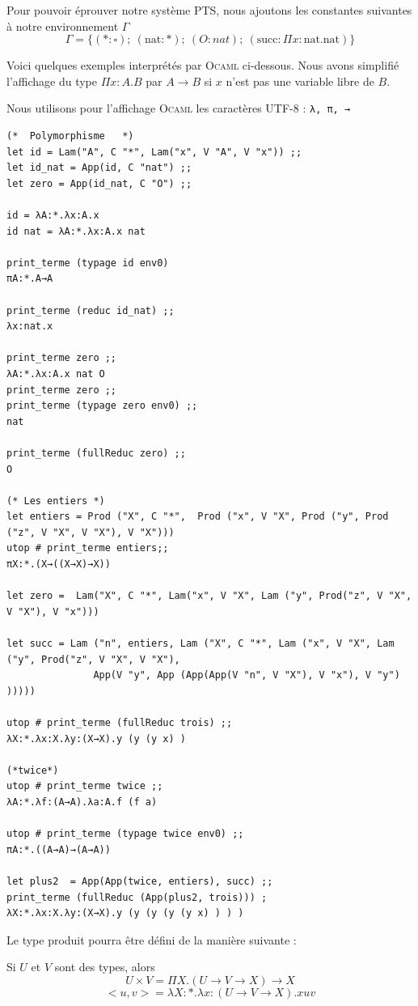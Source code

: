 Pour pouvoir éprouver notre système PTS, nous ajoutons les constantes suivantes à notre environnement $\Gamma$
$$\Gamma = \{ (*:\square) ;\ (\text{nat}:*) ;\ (O:nat) ;\ (\text{succ}:\Pi x:\text{nat}.\text{nat}) \} $$

Voici quelques exemples interprétés par \textsc{Ocaml} ci-dessous. Nous avons simplifié l'affichage
du type $\Pi x:A.B$ par $A\rightarrow B$ si $x$ n'est pas une variable libre de $B$.

Nous utilisons pour l'affichage \textsc{Ocaml} les caractères UTF-8 :  \texttt{λ, π, →}

\begin{verbatim}
(*  Polymorphisme   *)
let id = Lam("A", C "*", Lam("x", V "A", V "x")) ;;
let id_nat = App(id, C "nat") ;;
let zero = App(id_nat, C "O") ;;

id = λA:*.λx:A.x
id nat = λA:*.λx:A.x nat

print_terme (typage id env0) 
πA:*.A→A

print_terme (reduc id_nat) ;;
λx:nat.x

print_terme zero ;;
λA:*.λx:A.x nat O
print_terme zero ;;
print_terme (typage zero env0) ;;
nat

print_terme (fullReduc zero) ;;
O

(* Les entiers *)
let entiers = Prod ("X", C "*",  Prod ("x", V "X", Prod ("y", Prod ("z", V "X", V "X"), V "X")))
utop # print_terme entiers;;
πX:*.(X→((X→X)→X))

let zero =  Lam("X", C "*", Lam("x", V "X", Lam ("y", Prod("z", V "X", V "X"), V "x")))

let succ = Lam ("n", entiers, Lam ("X", C "*", Lam ("x", V "X", Lam ("y", Prod("z", V "X", V "X"),
               App(V "y", App (App(App(V "n", V "X"), V "x"), V "y") )))))

utop # print_terme (fullReduc trois) ;;
λX:*.λx:X.λy:(X→X).y (y (y x) ) 

(*twice*)
utop # print_terme twice ;;
λA:*.λf:(A→A).λa:A.f (f a) 

utop # print_terme (typage twice env0) ;;
πA:*.((A→A)→(A→A))

let plus2  = App(App(twice, entiers), succ) ;;
print_terme (fullReduc (App(plus2, trois))) ;
λX:*.λx:X.λy:(X→X).y (y (y (y (y x) ) ) )
\end{verbatim}
Le type produit pourra être défini de la manière suivante :

Si $U$ et $V$ sont des types, alors 
$$U\times V = \Pi X.(U\rightarrow V \rightarrow X)\rightarrow X$$
$$ <u,v> = \lambda X:*.\lambda x:(U \rightarrow V \rightarrow X). x u v $$ 

